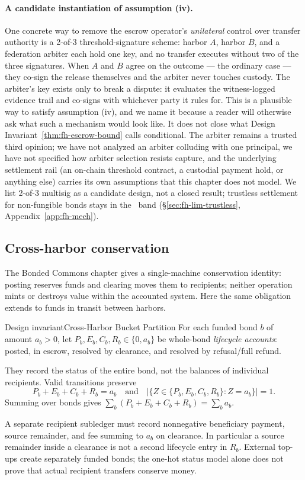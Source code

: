 \documentclass[11pt,a4paper]{article}
\theoremstyle{definition}
\theoremstyle{remark}
\begin{document}
\paragraph{A candidate instantiation of assumption (iv).} One concrete way to remove the escrow operator's \emph{unilateral} control over transfer authority is a 2-of-3 threshold-signature scheme: harbor $A$, harbor $B$, and a federation arbiter each hold one key, and no transfer executes without two of the three signatures. When $A$ and $B$ agree on the outcome --- the ordinary case --- they co-sign the release themselves and the arbiter never touches custody. The arbiter's key exists only to break a dispute: it evaluates the witness-logged evidence trail and co-signs with whichever party it rules for. This is a plausible way to satisfy assumption (iv), and we name it because a reader will otherwise ask what such a mechanism would look like. It does not close what Design Invariant~\ref{thm:fh-escrow-bound} calls conditional. The arbiter remains a trusted third opinion; we have not analyzed an arbiter colluding with one principal, we have not specified how arbiter selection resists capture, and the underlying settlement rail (an on-chain threshold contract, a custodial payment hold, or anything else) carries its own assumptions that this chapter does not model. We list 2-of-3 multisig as a candidate design, not a closed result; trustless settlement for non-fungible bonds stays in the \Open\ band (\S\ref{sec:fh-lim-trustless}, Appendix~\ref{app:fh-mech}).

\subsection{Cross-harbor conservation}\label{sec:fh-cross-conservation}

The Bonded Commons chapter gives a single-machine conservation identity:
posting reserves funds and clearing moves them to recipients; neither operation
mints or destroys value within the accounted system. Here the same obligation
extends to funds in transit between harbors.

\begin{pdclaim}{Design invariant}{Cross-Harbor Bucket Partition}
\setlength{\parskip}{4pt plus 1pt}
\label{prop:fh-cross-cons}
For each funded bond $b$ of amount $a_b>0$, let $P_b,E_b,C_b,R_b\in\{0,a_b\}$
be whole-bond \emph{lifecycle accounts}: posted, in escrow, resolved by clearance,
and resolved by refusal/full refund. 

They record the status of the entire bond,
not the balances of individual recipients. Valid transitions preserve
\[
P_b+E_b+C_b+R_b=a_b
\quad\text{and}\quad
\bigl|\{Z\in\{P_b,E_b,C_b,R_b\}:Z=a_b\}\bigr|=1.
\]
Summing over bonds gives $\sum_b(P_b+E_b+C_b+R_b)=\sum_b a_b$.


A separate recipient subledger must record nonnegative beneficiary payment,
source remainder, and fee summing to $a_b$ on clearance. In particular a source
remainder inside a clearance is not a second lifecycle entry in $R_b$.
External top-ups create separately funded bonds; the one-hot status model alone
does not prove that actual recipient transfers conserve money.
\end{pdclaim}
\end{document}

